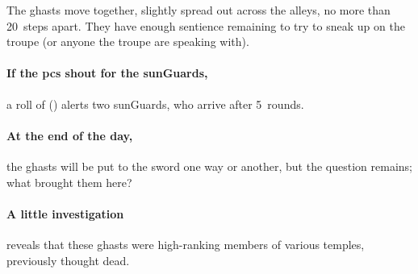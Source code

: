 The \glspl{ghast} move together, slightly spread out across the alleys, no more than 20~\glspl{step} apart.
They have enough sentience remaining to try to sneak up on the troupe (or anyone the troupe are speaking with).

\paragraph{If the \glspl{pc} shout for the \glspl{sunGuard},}
a roll of  (\tn[7]) alerts two \glspl{sunGuard}, who arrive after 5~\glspl{round}.

\paragraph{At the end of the day,}
the \glspl{ghast} will be put to the sword one way or another, but the question remains; what brought them here?

\paragraph{A little investigation}
reveals that these \glspl{ghast} were high-ranking members of various temples, previously thought dead.


